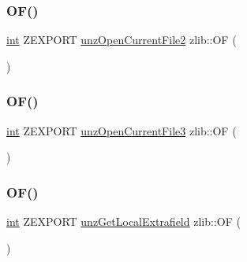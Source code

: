 \subsubsection{\texorpdfstring{O\+F()}{OF()}\hspace{0.1cm}{\footnotesize\ttfamily [11/13]}}
{\footnotesize\ttfamily \hyperlink{namespacezlib_a0c9da18d93722fcf02a354ae2b6ec1ba}{int} Z\+E\+X\+P\+O\+RT \hyperlink{unzip_8c_a5881cddc4d4941ff604508ee4a564c25}{unz\+Open\+Current\+File2} zlib\+::\+OF (\begin{DoxyParamCaption}\item[{(\hyperlink{namespacezlib_a48c1eb530e72d2132ea9cb6648f4047e}{unz\+File} file, \hyperlink{namespacezlib_a0c9da18d93722fcf02a354ae2b6ec1ba}{int} $\ast$method, \hyperlink{namespacezlib_a0c9da18d93722fcf02a354ae2b6ec1ba}{int} $\ast$level, \hyperlink{namespacezlib_a0c9da18d93722fcf02a354ae2b6ec1ba}{int} raw)}]{ }\end{DoxyParamCaption})}

\mbox{\label{namespacezlib_aa57d03a223346994e89625e93942b558}} 
\subsubsection{\texorpdfstring{O\+F()}{OF()}\hspace{0.1cm}{\footnotesize\ttfamily [12/13]}}
{\footnotesize\ttfamily \hyperlink{namespacezlib_a0c9da18d93722fcf02a354ae2b6ec1ba}{int} Z\+E\+X\+P\+O\+RT \hyperlink{unzip_8c_a5eb86267fb9a5e4f52a123df606b2af5}{unz\+Open\+Current\+File3} zlib\+::\+OF (\begin{DoxyParamCaption}\item[{(\hyperlink{namespacezlib_a48c1eb530e72d2132ea9cb6648f4047e}{unz\+File} file, \hyperlink{namespacezlib_a0c9da18d93722fcf02a354ae2b6ec1ba}{int} $\ast$method, \hyperlink{namespacezlib_a0c9da18d93722fcf02a354ae2b6ec1ba}{int} $\ast$level, \hyperlink{namespacezlib_a0c9da18d93722fcf02a354ae2b6ec1ba}{int} raw, const char $\ast$password)}]{ }\end{DoxyParamCaption})}

\mbox{\label{namespacezlib_af095169bb155f7c3daa1f0824f3d342d}} 
\subsubsection{\texorpdfstring{O\+F()}{OF()}\hspace{0.1cm}{\footnotesize\ttfamily [13/13]}}
{\footnotesize\ttfamily \hyperlink{namespacezlib_a0c9da18d93722fcf02a354ae2b6ec1ba}{int} Z\+E\+X\+P\+O\+RT \hyperlink{unzip_8c_a012cad9a0262291930ec7e34cd7c5bea}{unz\+Get\+Local\+Extrafield} zlib\+::\+OF (\begin{DoxyParamCaption}\item[{(\hyperlink{namespacezlib_a48c1eb530e72d2132ea9cb6648f4047e}{unz\+File} file, voidp \hyperlink{namespacezlib_a500d53d2dafa1e8390dc41cc14dd5553}{buf}, unsigned len)}]{ }\end{DoxyParamCaption})}

